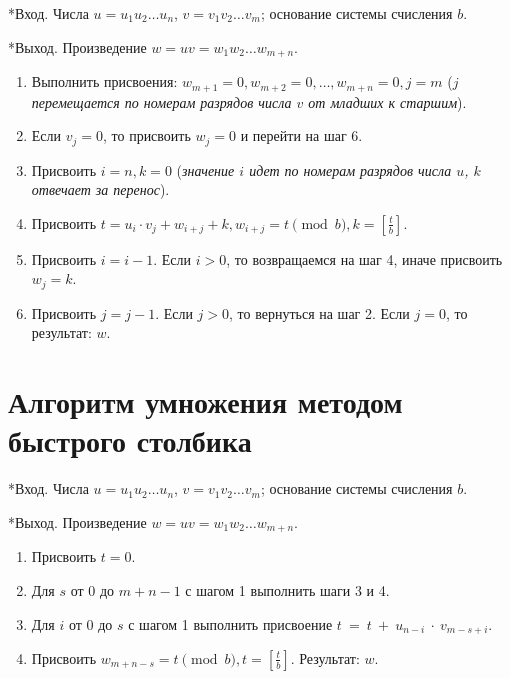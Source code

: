 \documentclass[
  english,
  russian,
  12pt,
  a4paper,
  DIV=11,
  numbers=noendperiod]{scrreprt}
\providecommand{\tightlist}{%
  \setlength{\itemsep}{0pt}\setlength{\parskip}{0pt}}
\begin{document}
*Вход. Числа \(u = u_1 u_2 \ldots u_n\), \(v = v_1 v_2 \ldots v_m\);
основание системы счисления \(b\).

*Выход. Произведение \(w = uv = w_1 w_2 \ldots w_{m+n}\).

\begin{enumerate}
\def\labelenumi{\arabic{enumi}.}
\tightlist
\item
  Выполнить присвоения:
  \(w_{m+1} = 0, w_{m+2} = 0, \ldots, w_{m+n} = 0, j = m\) (\emph{\(j\)
  перемещается по номерам разрядов числа \(v\) от младших к старшим}).
\item
  Если \(v_j = 0\), то присвоить \(w_j = 0\) и перейти на шаг 6.
\item
  Присвоить \(i = n, k = 0\) (\emph{значение \(i\) идет по номерам
  разрядов числа \(u\), \(k\) отвечает за перенос}).
\item
  Присвоить
  \(t = u_i \cdot v_j + w_{i+j} + k, w_{i+j} = t \pmod{b}, k = \left[ \frac{t}{b} \right]\).
\item
  Присвоить \(i = i - 1\). Если \(i > 0\), то возвращаемся на шаг 4,
  иначе присвоить \(w_j = k\).
\item
  Присвоить \(j = j - 1\). Если \(j > 0\), то вернуться на шаг 2. Если
  \(j = 0\), то результат: \(w\).
\end{enumerate}

\section{Алгоритм умножения методом быстрого
столбика}\label{ux430ux43bux433ux43eux440ux438ux442ux43c-ux443ux43cux43dux43eux436ux435ux43dux438ux44f-ux43cux435ux442ux43eux434ux43eux43c-ux431ux44bux441ux442ux440ux43eux433ux43e-ux441ux442ux43eux43bux431ux438ux43aux430}

*Вход. Числа \(u = u_1 u_2 \ldots u_n\), \(v = v_1 v_2 \ldots v_m\);
основание системы счисления \(b\).

*Выход. Произведение \(w = uv = w_1 w_2 \ldots w_{m+n}\).

\begin{enumerate}
\def\labelenumi{\arabic{enumi}.}
\tightlist
\item
  Присвоить \(t = 0\).
\item
  Для \(s\) от \(0\) до \(m + n - 1\) с шагом 1 выполнить шаги 3 и 4.
\item
  Для \(i\) от \(0\) до \(s\) с шагом 1 выполнить присвоение
  \(t~=~t~+~u_{n - i}~\cdot~v_{m - s + i}\).
\item
  Присвоить
  \(w_{m + n - s} = t \pmod{b}, t = \left[ \frac{t}{b} \right]\).
  Результат: \(w\).
\end{enumerate}
\end{document}
